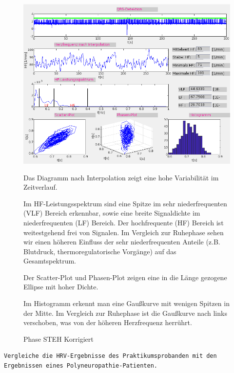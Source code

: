 \documentclass[a4paper,12pt,titlepage]{scrartcl}
\begin{document}
\begin{figure}[ht]
    \begin{minipage}[t]{0.5\linewidth}
        \centering
        \includegraphics[width=0.9\linewidth, valign=t]{Assets/LaborBMT-17-25-19.png}
        \caption{Phase STEH Korrigiert}
        \label{phasesteh2}
    \end{minipage}%
    \begin{minipage}[t]{0.5\linewidth}

        Das Diagramm nach Interpolation zeigt eine hohe Variabilität im Zeitverlauf.

        Im HF-Leistungsspektrum sind eine Spitze im sehr niederfrequenten (VLF) Bereich erkennbar, sowie eine breite Signaldichte im niederfrequenten (LF) Bereich. Der hochfrequente (HF) Bereich ist weitestgehend frei von Signalen. Im Vergleich zur Ruhephase sehen wir einen höheren Einfluss der sehr niederfrequenten Anteile (z.B. Blutdruck, thermoregulatorische Vorgänge) auf das Gesamtspektrum.

        Der Scatter-Plot und Phasen-Plot zeigen eine in die Länge gezogene Ellipse mit hoher Dichte.

        Im Histogramm erkennt man eine Gaußkurve mit wenigen Spitzen in der Mitte. Im Vergleich zur Ruhephase ist die Gaußkurve nach links verschoben, was von der höheren Herzfrequenz herrührt.

    \end{minipage}
\end{figure}
\cleardoublepage

\texttt{Vergleiche die HRV-Ergebnisse des Praktikumsprobanden mit den Ergebnissen eines Polyneuropathie-Patienten.}
\end{document}
